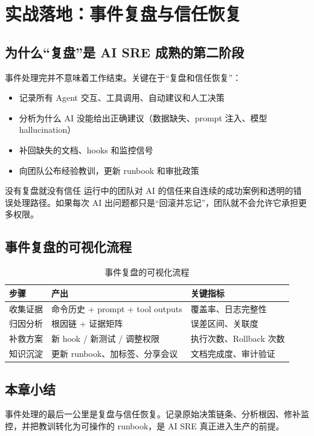 \section{实战落地：事件复盘与信任恢复}

\subsection{为什么“复盘”是 AI SRE 成熟的第二阶段}

事件处理完并不意味着工作结束。关键在于“复盘和信任恢复”：

\begin{itemize}
    \item 记录所有 Agent 交互、工具调用、自动建议和人工决策
    \item 分析为什么 AI 没能给出正确建议（数据缺失、prompt 注入、模型 hallucination）
    \item 补回缺失的文档、hooks 和监控信号
    \item 向团队公布经验教训，更新 runbook 和审批政策
\end{itemize}

\begin{warningbox}{没有复盘就没有信任}
运行中的团队对 AI 的信任来自连续的成功案例和透明的错误处理路径。如果每次 AI 出问题都只是“回滚并忘记”，团队就不会允许它承担更多权限。
\end{warningbox}

\subsection{事件复盘的可视化流程}

\begin{table}[H]
\centering
\begin{tabular}{p{} p{} p{}}
\toprule
步骤 & 产出 & 关键指标 \\
\midrule
收集证据 & 命令历史 + prompt + tool outputs & 覆盖率、日志完整性 \\
归因分析 & 根因链 + 证据矩阵 & 误差区间、关联度 \\
补救方案 & 新 hook / 新测试 / 调整权限 & 执行次数、Rollback 次数 \\
知识沉淀 & 更新 runbook、加标签、分享会议 & 文档完成度、审计验证 \\
\bottomrule
\end{tabular}
\caption{事件复盘的可视化流程}
\end{table}

\subsection{本章小结}

事件处理的最后一公里是复盘与信任恢复。记录原始决策链条、分析根因、修补监控，并把教训转化为可操作的 runbook，是 AI SRE 真正进入生产的前提。

